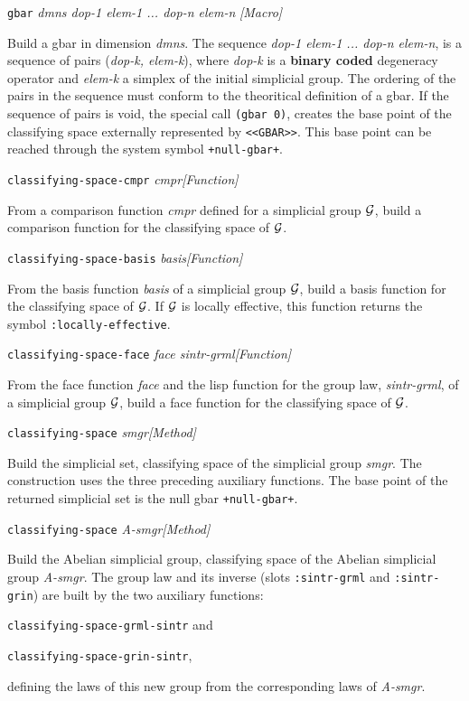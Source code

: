 {\parindent=0mm
{\leftskip=5mm
{\tt gbar} {\em dmns dop-1 elem-1 ... dop-n elem-n} \hfill {\em [Macro]} \par}
{\leftskip=15mm
Build a gbar in dimension {\em dmns}. The sequence {\em dop-1 elem-1 ... dop-n elem-n}, 
is a sequence of pairs ({\em dop-k, elem-k}), where {\em dop-k} is  a {\bf binary coded}
degeneracy operator and {\em elem-k} a simplex of the initial simplicial group. The ordering of
the pairs in the sequence must conform to the theoritical definition of a gbar. 
If the sequence of pairs is void, the special call {\tt (gbar 0)}, 
creates the base point of the classifying space
externally represented by {\tt <<GBAR>>}. This base point can be reached through 
the system symbol {\tt +null-gbar+}. \par}
{\leftskip=5mm
{\tt classifying-space-cmpr} {\em cmpr}\hfill {\em [Function]} \par}
{\leftskip=15mm
From a comparison function {\em cmpr} defined for a simplicial group ${\cal G}$, build a
comparison function for the classifying space of ${\cal G}$. \par}
{\leftskip=5mm
{\tt classifying-space-basis} {\em basis}\hfill {\em [Function]} \par}
{\leftskip=15mm
From the basis function {\em basis} of a simplicial group ${\cal G}$, build a
basis function for the classifying space of ${\cal G}$. If ${\cal G}$ is locally effective,
this function returns the symbol {\tt :locally-effective}.\par}
{\leftskip=5mm
{\tt classifying-space-face} {\em face sintr-grml}\hfill {\em [Function]} \par}
{\leftskip=15mm
From the face function {\em face} and the lisp function for the group law, {\em sintr-grml},
of a simplicial group ${\cal G}$, build a
face function for the classifying space of ${\cal G}$. \par}
{\leftskip=5mm
{\tt classifying-space} {\em smgr}\hfill {\em [Method]} \par}
{\leftskip=15mm
Build the simplicial set, classifying space of the simplicial group {\em smgr}.
The construction uses the three preceding auxiliary functions. The base point
of the returned simplicial set is the null gbar {\tt +null-gbar+}. \par}
{\leftskip=5mm
{\tt classifying-space} {\em A-smgr}\hfill {\em [Method]} \par}
{\leftskip=15mm
Build the Abelian simplicial group, classifying space of the Abelian simplicial group {\em A-smgr}.
The group law and its inverse (slots {\tt :sintr-grml} and {\tt :sintr-grin}) are built
by the two auxiliary functions: \par}
{\leftskip=20mm
{\tt classifying-space-grml-sintr} and \par}
{\leftskip=20mm
{\tt classifying-space-grin-sintr}, \par}
{\leftskip=15mm
defining the laws of this new group from the corresponding laws of {\em A-smgr}. \par}
}

